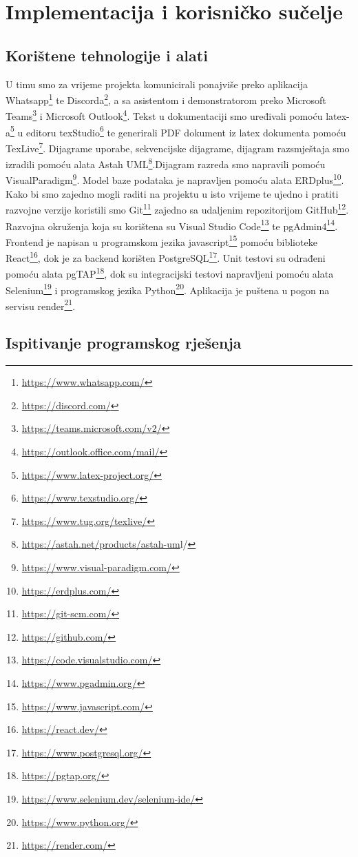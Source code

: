 \chapter{Implementacija i korisničko sučelje}
		
		
		\section{Korištene tehnologije i alati}

			 U timu smo za vrijeme projekta komunicirali ponajviše preko aplikacija Whatsapp\footnote{\url{https://www.whatsapp.com/}} te Discorda\footnote{\url{https://discord.com/}}, a sa asistentom i demonstratorom preko Microsoft Teams\footnote{\url{https://teams.microsoft.com/v2/}} i Microsoft Outlook\footnote{\url{https://outlook.office.com/mail/}}. Tekst u dokumentaciji smo uređivali pomoću latex-a\footnote{\url{https://www.latex-project.org/}} u editoru texStudio\footnote{\url{https://www.texstudio.org/}} te generirali PDF dokument iz latex dokumenta pomoću TexLive\footnote{\url{https://www.tug.org/texlive/}}. Dijagrame uporabe, sekvencijske dijagrame, dijagram razsmještaja smo izradili pomoću alata Astah UML\footnote{\url{https://astah.net/products/astah-um}l/}.Dijagram razreda smo napravili pomoću VisualParadigm\footnote{\url{https://www.visual-paradigm.com/}}. Model baze podataka je napravljen pomoću alata ERDplus\footnote{\url{https://erdplus.com/}}. Kako bi smo zajedno mogli raditi na projektu u isto vrijeme te ujedno i pratiti razvojne verzije koristili smo Git\footnote{\url{https://git-scm.com/}} zajedno sa udaljenim repozitorijom GitHub\footnote{\url{https://github.com/}}. Razvojna okruženja koja su korištena su Visual Studio Code\footnote{\url{https://code.visualstudio.com/}} te pgAdmin4\footnote{\url{https://www.pgadmin.org/}}. Frontend je napisan u programskom jezika javascript\footnote{\url{https://www.javascript.com/}} pomoću biblioteke React\footnote{\url{https://react.dev/}}, dok je za backend korišten PostgreSQL\footnote{\url{https://www.postgresql.org/}}. Unit testovi su odrađeni pomoću alata pgTAP\footnote{\url{https://pgtap.org/}}, dok su integracijski testovi napravljeni pomoću alata Selenium\footnote{\url{https://www.selenium.dev/selenium-ide/}} i programskog  jezika Python\footnote{\url{https://www.python.org/}}.
			 Aplikacija je puštena u pogon na servisu render\footnote{\url{https://render.com/}}.
			\eject 
		
	
		\section{Ispitivanje programskog rješenja}
			
